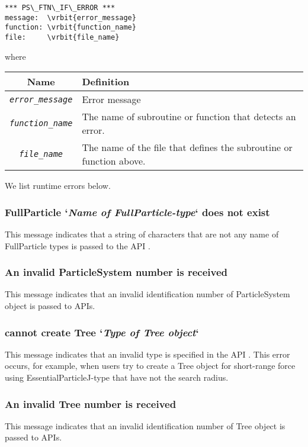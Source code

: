 \begin{screen}
\begin{Verbatim}[commandchars=\\\{\}]
*** PS\_FTN\_IF\_ERROR ***
message:  \vrbit{error_message}
function: \vrbit{function_name}
file:     \vrbit{file_name}
\end{Verbatim} 
\end{screen}
where
\begin{table}[H]
\begin{tabularx}{\linewidth}{cX}
\toprule
\rowcolor{Snow2}
Name & Definition \\
\midrule
\textit{\texttt{error\_message}} & Error message \\
\textit{\texttt{function\_name}} & The name of subroutine or function that detects an error. \\
\textit{\texttt{file\_name}}     & The name of the file that defines the subroutine or function above. \\
\bottomrule
\end{tabularx}
\end{table}

We list runtime errors below.

\subsubsection{FullParticle `\textit{Name of FullParticle-type}` does not exist}
This message indicates that a string of characters that are not any name of FullParticle types is passed to the API .

\subsubsection{An invalid ParticleSystem number is received}
This message indicates that an invalid identification number of ParticleSystem object is passed to APIs.

\subsubsection{cannot create Tree `\textit{Type of Tree object}`}
This message indicates that an invalid type is specified in the API . This error occurs, for example, when users try to create a Tree object for short-range force using EssentialParticleJ-type that have not the search radius.

\subsubsection{An invalid Tree number is received}
This message indicates that an invalid identification number of Tree object is passed to APIs.

